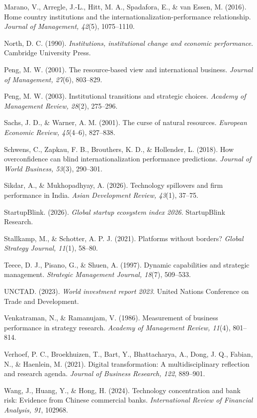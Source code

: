 \documentclass[12pt,a4paper]{article}
\begin{document}
Marano, V., Arregle, J.-L., Hitt, M. A., Spadafora, E., \& van Essen, M.
(2016). Home country institutions and the
internationalization-performance relationship. \emph{Journal of
Management, 42}(5), 1075--1110.

North, D. C. (1990). \emph{Institutions, institutional change and
economic performance}. Cambridge University Press.

Peng, M. W. (2001). The resource-based view and international business.
\emph{Journal of Management, 27}(6), 803--829.

Peng, M. W. (2003). Institutional transitions and strategic choices.
\emph{Academy of Management Review, 28}(2), 275--296.

Sachs, J. D., \& Warner, A. M. (2001). The curse of natural resources.
\emph{European Economic Review, 45}(4--6), 827--838.

Schwens, C., Zapkau, F. B., Brouthers, K. D., \& Hollender, L. (2018).
How overconfidence can blind internationalization performance
predictions. \emph{Journal of World Business, 53}(3), 290--301.

Sikdar, A., \& Mukhopadhyay, A. (2026). Technology spillovers and firm
performance in India. \emph{Asian Development Review, 43}(1), 37--75.

StartupBlink. (2026). \emph{Global startup ecosystem index 2026}.
StartupBlink Research.

Stallkamp, M., \& Schotter, A. P. J. (2021). Platforms without borders?
\emph{Global Strategy Journal, 11}(1), 58--80.

Teece, D. J., Pisano, G., \& Shuen, A. (1997). Dynamic capabilities and
strategic management. \emph{Strategic Management Journal, 18}(7),
509--533.

UNCTAD. (2023). \emph{World investment report 2023}. United Nations
Conference on Trade and Development.

Venkatraman, N., \& Ramanujam, V. (1986). Measurement of business
performance in strategy research. \emph{Academy of Management Review,
11}(4), 801--814.

Verhoef, P. C., Broekhuizen, T., Bart, Y., Bhattacharya, A., Dong, J.
Q., Fabian, N., \& Haenlein, M. (2021). Digital transformation: A
multidisciplinary reflection and research agenda. \emph{Journal of
Business Research, 122}, 889--901.

Wang, J., Huang, Y., \& Hong, H. (2024). Technology concentration and
bank risk: Evidence from Chinese commercial banks. \emph{International
Review of Financial Analysis, 91}, 102968.
\end{document}
